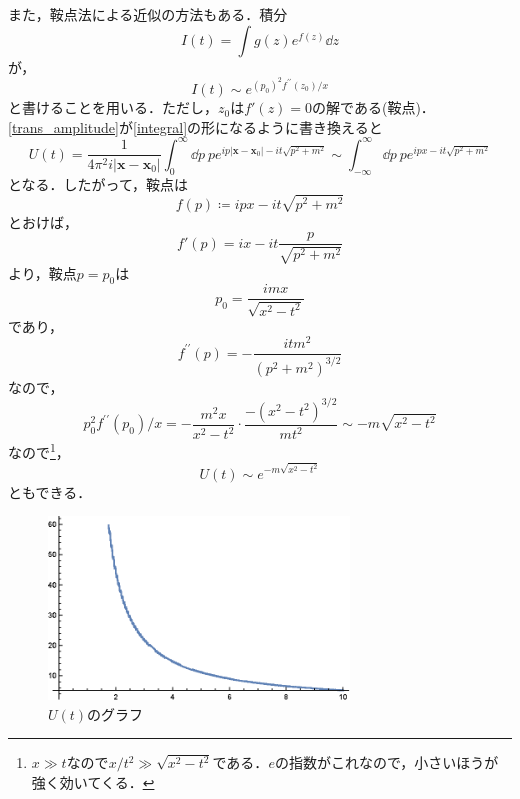 \documentclass[a4paper,pdflatex,ja=standard]{bxjsarticle}
\begin{document}
また，鞍点法による近似の方法もある．積分
\begin{equation}
  I(t)
  =
  \int g(z)e^{f(z)}\dd z
  \label{integral}
\end{equation}
が，
\begin{equation}
  I(t)
  \sim
  e^{(p_{0})^2 f^{\prime\prime}(z_{0})/x}
\end{equation}
と書けることを用いる．ただし，$z_{0}$は$f'(z)=0$の解である(鞍点)．\eqref{trans_amplitude}が\eqref{integral}の形になるように書き換えると
\begin{equation}
  U(t)
  =
  \frac{1}{4\pi^2 i|\bm{x}-\bm{x}_{0}|}
  \int_{0}^{\infty} \dd p\ 
  pe^{ip|\bm{x}-\bm{x}_{0}|-it\sqrt{p^2+m^2}}
  \sim
  \int_{-\infty}^{\infty} \dd p\ 
  pe^{ipx-it\sqrt{p^2+m^2}}
\end{equation}
となる．したがって，鞍点は
\begin{equation}
  f(p)
  \coloneqq
  ipx-it\sqrt{p^2+m^2}
\end{equation}
とおけば，
\begin{equation}
  f'(p)
  =
  ix-it\frac{p}{\sqrt{p^2+m^2}}
\end{equation}
より，鞍点$p=p_{0}$は
\begin{equation}
  p_{0}
  =
  \frac{imx}{\sqrt{x^2-t^2}}
\end{equation}
であり，
\begin{equation}
  f^{\prime\prime}(p)
  =
  -\frac{itm^2}{(p^2+m^2)^{3/2}}
\end{equation}
なので，
\begin{equation}
  p_{0}^2 f^{\prime\prime}(p_{0})/x
  =
  -\frac{m^2 x}{x^2-t^2}\cdot\frac{-(x^2-t^2)^{3/2}}{mt^2}
  \sim
  -m\sqrt{x^2-t^2}
\end{equation}
なので\footnote{$x\gg t$なので$x/t^2\gg \sqrt{x^2-t^2}$である．$e$の指数がこれなので，小さいほうが強く効いてくる．}，
\begin{equation}
  U(t)
  \sim
  e^{-m\sqrt{x^2-t^2}}
\end{equation}
ともできる．

\begin{figure}[ht]
  \centering
  \includegraphics[width=8cm]{nb/trans_amplitude_relative.eps}
  \caption{$U(t)$のグラフ}
  \label{trans_amplitude_fig}
\end{figure}
\end{document}
